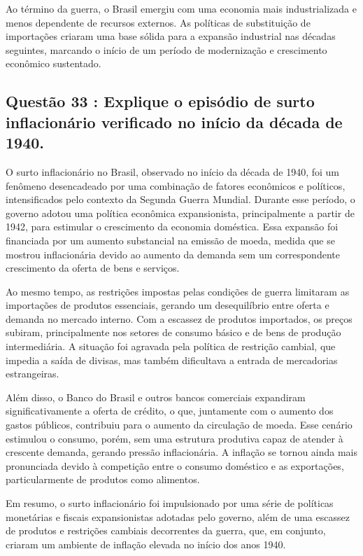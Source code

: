 \documentclass[a4paper,12pt]{article}[abntex2]
\begin{document}
Ao término da guerra, o Brasil emergiu com uma economia mais industrializada e menos dependente de recursos externos. As políticas de substituição de importações criaram uma base sólida para a expansão industrial nas décadas seguintes, marcando o início de um período de modernização e crescimento econômico sustentado.

\subsection{\textbf{Questão 33 : Explique o episódio de surto inflacionário verificado no início da década de 1940.}}

O surto inflacionário no Brasil, observado no início da década de 1940, foi um fenômeno desencadeado por uma combinação de fatores econômicos e políticos, intensificados pelo contexto da Segunda Guerra Mundial. Durante esse período, o governo adotou uma política econômica expansionista, principalmente a partir de 1942, para estimular o crescimento da economia doméstica. Essa expansão foi financiada por um aumento substancial na emissão de moeda, medida que se mostrou inflacionária devido ao aumento da demanda sem um correspondente crescimento da oferta de bens e serviços.

Ao mesmo tempo, as restrições impostas pelas condições de guerra limitaram as importações de produtos essenciais, gerando um desequilíbrio entre oferta e demanda no mercado interno. Com a escassez de produtos importados, os preços subiram, principalmente nos setores de consumo básico e de bens de produção intermediária. A situação foi agravada pela política de restrição cambial, que impedia a saída de divisas, mas também dificultava a entrada de mercadorias estrangeiras.

Além disso, o Banco do Brasil e outros bancos comerciais expandiram significativamente a oferta de crédito, o que, juntamente com o aumento dos gastos públicos, contribuiu para o aumento da circulação de moeda. Esse cenário estimulou o consumo, porém, sem uma estrutura produtiva capaz de atender à crescente demanda, gerando pressão inflacionária. A inflação se tornou ainda mais pronunciada devido à competição entre o consumo doméstico e as exportações, particularmente de produtos como alimentos.

Em resumo, o surto inflacionário foi impulsionado por uma série de políticas monetárias e fiscais expansionistas adotadas pelo governo, além de uma escassez de produtos e restrições cambiais decorrentes da guerra, que, em conjunto, criaram um ambiente de inflação elevada no início dos anos 1940.
\end{document}
